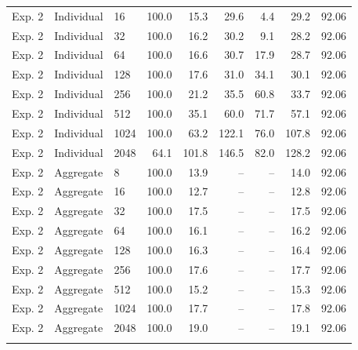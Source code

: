 \begin{table}[!t]
\begin{tabular}{@{}lllrrrrrr@{}}
Exp. 2 & Individual & 16 & 100.0 & 15.3 & 29.6 & 4.4 & 29.2 & 92.06 \\
Exp. 2 & Individual & 32 & 100.0 & 16.2 & 30.2 & 9.1 & 28.2 & 92.06 \\
Exp. 2 & Individual & 64 & 100.0 & 16.6 & 30.7 & 17.9 & 28.7 & 92.06 \\
Exp. 2 & Individual & 128 & 100.0 & 17.6 & 31.0 & 34.1 & 30.1 & 92.06 \\
Exp. 2 & Individual & 256 & 100.0 & 21.2 & 35.5 & 60.8 & 33.7 & 92.06 \\
Exp. 2 & Individual & 512 & 100.0 & 35.1 & 60.0 & 71.7 & 57.1 & 92.06 \\
Exp. 2 & Individual & 1024 & 100.0 & 63.2 & 122.1 & 76.0 & 107.8 & 92.06 \\
Exp. 2 & Individual & 2048 & 64.1 & 101.8 & 146.5 & 82.0 & 128.2 & 92.06 \\
\addlinespace[2pt]
Exp. 2 & Aggregate & 8 & 100.0 & 13.9 & -- & -- & 14.0 & 92.06 \\
Exp. 2 & Aggregate & 16 & 100.0 & 12.7 & -- & -- & 12.8 & 92.06 \\
Exp. 2 & Aggregate & 32 & 100.0 & 17.5 & -- & -- & 17.5 & 92.06 \\
Exp. 2 & Aggregate & 64 & 100.0 & 16.1 & -- & -- & 16.2 & 92.06 \\
Exp. 2 & Aggregate & 128 & 100.0 & 16.3 & -- & -- & 16.4 & 92.06 \\
Exp. 2 & Aggregate & 256 & 100.0 & 17.6 & -- & -- & 17.7 & 92.06 \\
Exp. 2 & Aggregate & 512 & 100.0 & 15.2 & -- & -- & 15.3 & 92.06 \\
Exp. 2 & Aggregate & 1024 & 100.0 & 17.7 & -- & -- & 17.8 & 92.06 \\
Exp. 2 & Aggregate & 2048 & 100.0 & 19.0 & -- & -- & 19.1 & 92.06 \\
\addlinespace[2pt]
\bottomrule
\end{tabular}
\end{table}

